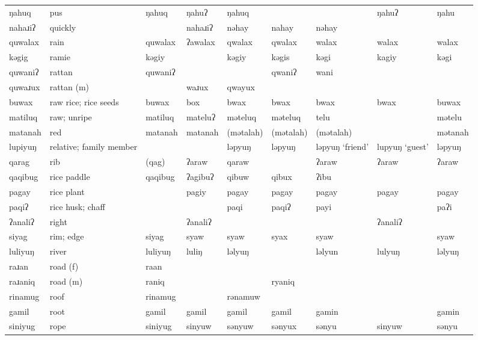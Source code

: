\begin{landscape}
\begin{longtable}{*{9}{>{\raggedright\arraybackslash}p{}}}
\text{*}ŋahuq        & pus & ŋahuq & ŋahuʔ & ŋahuq &  &  & ŋahuʔ & ŋahu\\
\text{*}nahaɹiʔ      & quickly &  & nahaɹiʔ & nəhay & nahay & nəhay &  & \\
\text{*}quwalax      & rain & quwalax & ʔawalax & qwalax & qwalax & walax & walax & walax\\
\text{*}kəgig        & ramie & kəgiy &  & kəgiy & kəgis & kəgi & kagiy & kəgi\\
\text{*}quwaniʔ      & rattan & quwaniʔ &  &  & qwaniʔ & wani &  & \\
\text{*}quwaɹux      & rattan (m) &  & waɹux & qwayux &  &  &  & \\
\text{*}buwax        & raw rice; rice seeds & buwax & box & bwax & bwax & bwax & bwax & buwax\\
\text{*}matiluq      & raw; unripe & matiluq & mateluʔ & məteluq & məteluq & telu &  & mətelu\\
\text{*}matanah      & red & matanah & matanah & (mətalah) & (mətalah) & (mətalah) &  & mətanah\\
\text{*}lupiyuŋ      & relative; family member &  &  & ləpyuŋ & ləpyuŋ & ləpyuŋ `friend' & lupyuŋ `guest' & ləpyuŋ\\
\text{*}qarag        & rib & (qag) & ʔaraw & qaraw &  & ʔaraw & ʔaraw & ʔaraw\\
\text{*}qaqibug      & rice paddle & qaqibug & ʔagibuʔ & qibuw & qibux & ʔibu &  & \\
\text{*}pagay        & rice plant &  & pagiy & pagay & pagay & pagay & pagay & pagay\\
\text{*}paqiʔ        & rice husk; chaff &  &  & paqi & paqiʔ & payi &  & paʔi\\
\text{*}ʔanaliʔ      & right &  & ʔanaliʔ &  &  &  & ʔanaliʔ & \\
\text{*}siyag        & rim; edge & siyag & syaw & syaw & syax & syaw &  & syaw\\
\text{*}luliyuŋ      & river & luliyuŋ & luliŋ & ləlyuŋ &  & ləlyun & lulyuŋ & ləlyuŋ\\
\text{*}raɹan        & road (f) & raan &  &  &  &  &  & \\
\text{*}raɹaniq      & road (m) & raniq &  &  & ryaniq &  &  & \\
\text{*}rinamug      & roof & rinamug &  & rənamuw &  &  &  & \\
\text{*}gamil        & root & gamil & gamil & gamil & gamil & gamin &  & gamin\\
\text{*}siniyug      & rope & siniyug & sinyuw & sənyuw & sənyux & sənyu & sinyuw & sənyu\\

\end{longtable}
\end{landscape}
